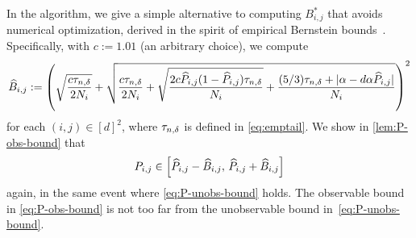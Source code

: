In the algorithm, we give a simple alternative to computing
$B_{i,j}^*$ that avoids numerical optimization, derived in the spirit
of empirical Bernstein bounds~\citep{audibert2009}.
Specifically, with $c := 1.01$ (an arbitrary choice), we compute
\begin{equation}
  \widehat{B}_{i,j}
  :=
  \left(
    \sqrt{\frac{c\tau_{n,\delta}}{2N_i}}
    + \sqrt{
      \frac{c\tau_{n,\delta}}{2N_i}
      +
      \sqrt{\frac{2c\widehat{P}_{i,j}(1-\widehat{P}_{i,j})\tau_{n,\delta}}{N_i}}
      + \frac{(5/3)\tau_{n,\delta} + |\alpha-d\alpha\widehat{P}_{i,j}|}{N_i}
    }
  \right)^2
  \label{eq:P-obs-bound}
\end{equation}
for each $(i,j) \in [d]^2$, where $\tau_{n,\delta}$ is defined in
\cref{eq:emptail}.
We show in \cref{lem:P-obs-bound} that
\[
  P_{i,j} \in
  \left[
    \widehat{P}_{i,j} - \widehat{B}_{i,j},\,
    \widehat{P}_{i,j} + \widehat{B}_{i,j}
  \right]
\]
again, in the same event where \cref{eq:P-unobs-bound} holds.
The observable bound in \cref{eq:P-obs-bound} is not too far from the
unobservable bound in~\cref{eq:P-unobs-bound}.

